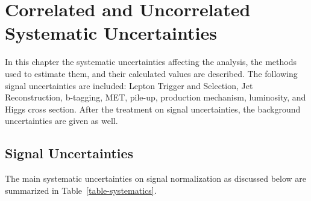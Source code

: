 

\chapter{Correlated and Uncorrelated Systematic Uncertainties}
\label{sec:systematics}


In this chapter the systematic uncertainties affecting the analysis, the methods used to estimate them, and their calculated values are described. The following signal uncertainties are included: Lepton Trigger and Selection, Jet Reconstruction, b-tagging, MET, pile-up, production mechanism, luminosity, and Higgs cross section.  After the treatment on signal uncertainties, the background uncertainties are given as well.




\section{Signal Uncertainties}
The main systematic uncertainties on signal normalization as discussed below are summarized in Table~\ref{table-systematics}.

